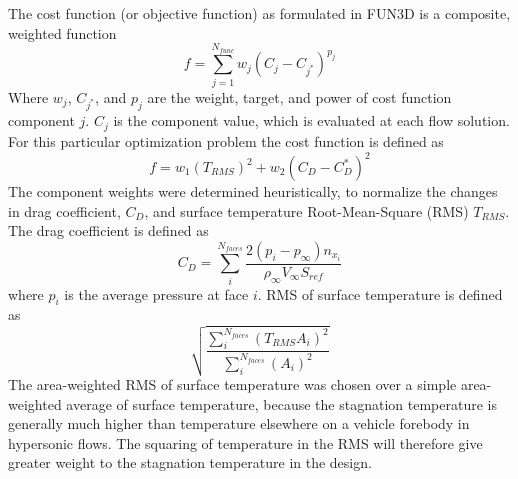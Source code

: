 The cost function (or objective function) as formulated in FUN3D is a composite,
weighted function
\begin{equation}
  f = \sum_{j=1}^{N_{func}}w_j\left( C_j - C_{j^*} \right)^{p_j}
  \label{generic-cost-function}
\end{equation}
Where $w_j$, $C_{j^*}$, and $p_j$ are the weight, target, and power of cost
function component $j$.  $C_j$ is the component value, which is evaluated at
each flow solution.  For this particular optimization problem the cost function
is defined as 
\begin{equation}
  f = w_1\left( T_{RMS} \right)^{2} + w_2\left( C_{D} - C_{D}^{*} \right)^2
  \label{cd-tt-cost-function}
\end{equation}
The component weights were determined heuristically, to normalize the changes in
drag coefficient, $C_D$, and surface temperature Root-Mean-Square (RMS) $T_{RMS}$.
The drag coefficient is defined as
\begin{equation}
  C_D = \sum_{i}^{N_{faces}}
        \frac{2\left( p_i - p_\infty \right)n_{x_{i}}}
        {\rho_{\infty} V_{\infty}S_{ref}}
  \label{drag-coef-def}
\end{equation}
where $p_i$ is the average pressure at face $i$.  RMS of surface temperature is
defined as
\begin{equation}
  \sqrt{
    \frac{\sum_{i}^{N_{faces}}\left( T_{RMS} A_i \right)^2}
       {\sum_{i}^{N_{faces}}\left( A_i \right)^2}
     }
  \label{tt-rms-def}
\end{equation}
The area-weighted RMS of surface temperature was chosen over a simple
area-weighted average of surface temperature, because the stagnation temperature
is generally much higher than temperature elsewhere on a vehicle forebody in
hypersonic flows.  The squaring of temperature in the RMS will therefore give
greater weight to the stagnation temperature in the design.




